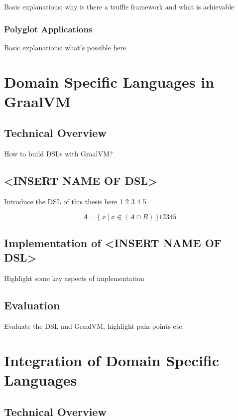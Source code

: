 \documentclass[12pt]{article}
\begin{document}
Basic explanations: why is there a truffle framework and what is achievable

\subsubsection{Polyglot Applications}
\label{sec:org01762bd}

Basic explanations: what's possible here

\section{Domain Specific Languages in GraalVM}
\label{sec:org10eaa99}

\subsection{Technical Overview}
\label{sec:org851068c}

How to build DSLs with GraalVM?

\subsection{<INSERT NAME OF DSL>}
\label{sec:org83ced5a}

Introduce the DSL of this thesis here 1 2 3 4 5

\begin{equation}
A = \{\ x\ |\ x \in (A \cap B)\ \} 1 2 3 4 5
\end{equation}

\subsection{Implementation of <INSERT NAME OF DSL>}
\label{sec:org3dd4a1f}

Highlight some key aspects of implementation

\subsection{Evaluation}
\label{sec:org94acfc7}

Evaluate the DSL and GraalVM, highlight pain points etc.

\section{Integration of Domain Specific Languages}
\label{sec:org77c3863}

\subsection{Technical Overview}
\label{sec:org1fcd6a7}
\end{document}
